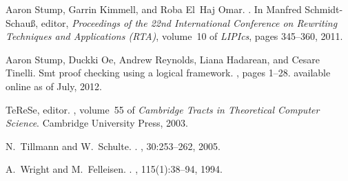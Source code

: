 \documentclass{LMCS}
\begin{document}
\begin{thebibliography}{10}
Aaron Stump, Garrin Kimmell, and Roba El~Haj Omar.
.
\newblock In Manfred Schmidt-Schau{\ss}, editor, {\em Proceedings of the 22nd
  International Conference on Rewriting Techniques and Applications (RTA)},
  volume~10 of {\em LIPIcs}, pages 345--360, 2011.

Aaron Stump, Duckki Oe, Andrew Reynolds, Liana Hadarean, and Cesare Tinelli.
\newblock Smt proof checking using a logical framework.
, pages 1--28.
\newblock available online as of July, 2012.

TeReSe, editor.
, volume~55 of {\em Cambridge Tracts in
  Theoretical Computer Science}.
\newblock Cambridge University Press, 2003.

N.~Tillmann and W.~Schulte.
.
, 30:253--262, 2005.

A.~Wright and M.~Felleisen.
.
, 115(1):38--94, 1994.

\end{thebibliography}
\end{document}
